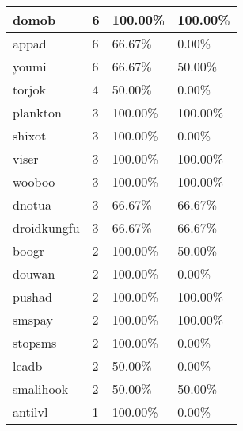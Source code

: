 \begin{table}[]
\begin{tabular}{|l|l|l|l|}
domob                   & 6                & 100.00\%              & 100.00\%                   \\ \hline
appad                   & 6                & 66.67\%               & 0.00\%                     \\ \hline
youmi                   & 6                & 66.67\%               & 50.00\%                    \\ \hline
torjok                  & 4                & 50.00\%               & 0.00\%                     \\ \hline
plankton                & 3                & 100.00\%              & 100.00\%                   \\ \hline
shixot                  & 3                & 100.00\%              & 0.00\%                     \\ \hline
viser                   & 3                & 100.00\%              & 100.00\%                   \\ \hline
wooboo                  & 3                & 100.00\%              & 100.00\%                   \\ \hline
dnotua                  & 3                & 66.67\%               & 66.67\%                    \\ \hline
droidkungfu             & 3                & 66.67\%               & 66.67\%                    \\ \hline
boogr                   & 2                & 100.00\%              & 50.00\%                    \\ \hline
douwan                  & 2                & 100.00\%              & 0.00\%                     \\ \hline
pushad                  & 2                & 100.00\%              & 100.00\%                   \\ \hline
smspay                  & 2                & 100.00\%              & 100.00\%                   \\ \hline
stopsms                 & 2                & 100.00\%              & 0.00\%                     \\ \hline
leadb                   & 2                & 50.00\%               & 0.00\%                     \\ \hline
smalihook               & 2                & 50.00\%               & 50.00\%                    \\ \hline
antilvl                 & 1                & 100.00\%              & 0.00\%                     \\ \hline

\end{tabular}
\end{table}
